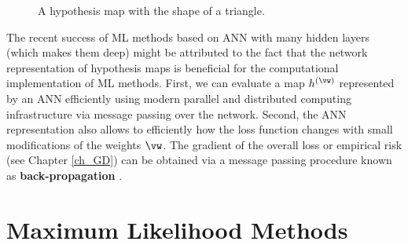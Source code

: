 \documentclass[12pt]{report}
\begin{document}
\begin{figure}[htbp]
\begin{center}
     \vspace*{-10mm}
\end{center}
\caption{A hypothesis map with the shape of a triangle.}
\label{fig_triangle}
\end{figure}

The recent success of ML methods based on ANN with many hidden layers 
(which makes them deep) might be attributed to the fact that the network 
representation of hypothesis maps is beneficial for the computational 
implementation of ML methods. First, we can evaluate a map $h^{(\vw)}$ represented 
by an ANN efficiently using modern parallel and distributed computing 
infrastructure via message passing over the network. Second, the ANN 
representation also allows to efficiently how the loss function changes with small 
modifications of the weights $\vw$. The gradient of the overall loss or empirical risk 
(see Chapter \ref{ch_GD}) can be obtained via a message passing procedure known 
as {\bf back-propagation} \cite{Goodfellow-et-al-2016}.

\section{Maximum Likelihood Methods}
\label{sec_max_iikelihood}
\end{document}
